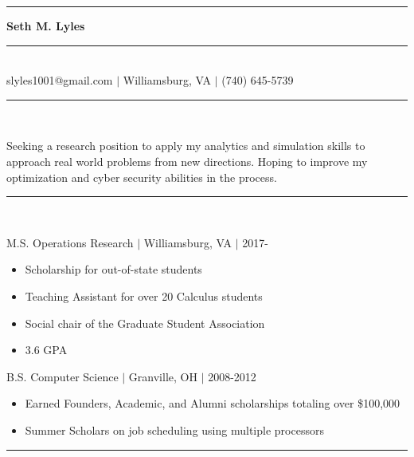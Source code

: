 \documentclass[11pt]{article}
\begin{document}
\begin{center}
\noindent\rule[5pt]{173pt}{.4pt}\LARGE\bf{ Seth M. Lyles }\rule[5pt]{173pt}{.4pt}\\ %
{\large slyles1001@gmail.com $|$ Williamsburg, VA $|$ (740) 645-5739}
\end{center}
\vspace{8pt}
\hrule\vspace{10pt}
\\
\vspace{-8pt}

Seeking a research position to apply my analytics and simulation skills to approach real world problems from new directions. Hoping to improve my optimization and cyber security abilities in the process.

\vspace{8pt}\hrule\vspace{10pt}
\\
\vspace{-8pt}

\hfill {M.S. Operations Research $|$ Williamsburg, VA $|$ 2017-}

\begin{itemize}
\item Scholarship for out-of-state students
\item Teaching Assistant for over 20 Calculus students
\item Social chair of the Graduate Student Association
\item 3.6 GPA
\end{itemize}

\hfill { B.S. Computer Science $|$ Granville, OH $|$ 2008-2012}

\begin{itemize}
\item Earned Founders, Academic, and Alumni scholarships totaling over \$100,000
\item Summer Scholars on job scheduling using multiple processors
\end{itemize}

\vspace{8pt}\hrule\vspace{10pt}
\\
\vspace{-8pt}
\end{document}
